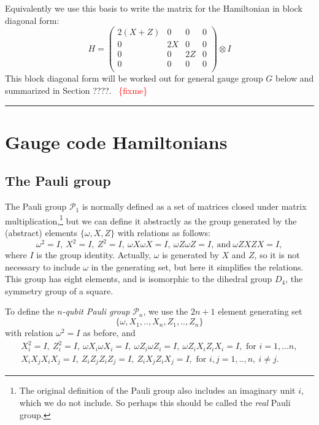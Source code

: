 \documentclass[11pt,oneside]{article}
\newcommand{\todo}[1]{\ \textcolor{red}{\{#1\}}\ }
\def\Ham{H}
\def\Pauli{\mathcal{P}}
\newcommand\tombstone{\rule{.36em}{2ex}\vskip 5pt}
\begin{document}
Equivalently we use this basis to 
write the matrix for the Hamiltonian in
block diagonal form:
$$
\Ham = 
\left( \begin{array}{cccc}
2(X+Z) & 0 & 0 & 0 \\
0  & 2X & 0 & 0 \\
0  & 0 & 2Z & 0 \\
0  & 0 & 0 & 0 \\
\end{array} \right) \otimes I
$$
This block diagonal form will be worked out for
general gauge group $G$ below and summarized in Section ????.
\todo{fixme}
\tombstone


\section{Gauge code Hamiltonians}

\subsection{The Pauli group}

The Pauli group $\Pauli_1$ is normally 
defined as a set of matrices closed under
matrix multiplication,\footnote{The original definition of the Pauli
group also includes an imaginary unit $i$, which we
do not include. So perhaps this should be called the
\emph{real} Pauli group.}
but we can define it abstractly
as the group generated
by the (abstract) elements $\{\omega, X, Z\}$ with
relations as follows:
$$
\omega^2=I,\ X^2=I,\ Z^2=I,\ \omega X\omega X=I,\ \omega Z\omega Z=I,\ \mbox{and}\  \omega ZXZX=I,
$$
where $I$ is the group identity.
Actually, $\omega $ is generated by $X$ and $Z$,
so it is not necessary to include $\omega $ in the generating set,
but here it simplifies the relations.
This group has eight elements, and is isomorphic to the dihedral group $D_4$,
the symmetry group of a square.

To define
the {\it $n$-qubit Pauli group} $\Pauli_n$, 
we use the $2n+1$ element 
generating set 
$$\{\omega , X_1, .., X_n, Z_1, .., Z_n\}$$
with relation $\omega^2=I$ as before, and
\begin{equation}\label{presentation}
\begin{array}{c}
X_i^2=I,\ Z_i^2=I,\ \omega X_i\omega X_i=I,\ \omega Z_i\omega Z_i=I,\ \omega Z_iX_iZ_iX_i=I, 
\mbox{\ for\ } i=1,...n,\\
X_iX_jX_iX_j=I,\ 
Z_iZ_jZ_iZ_j=I,\ 
Z_iX_jZ_iX_j=I, \mbox{\ for\ } i, j = 1,..,n,\ i\ne j.
\end{array}
\end{equation}
\end{document}
